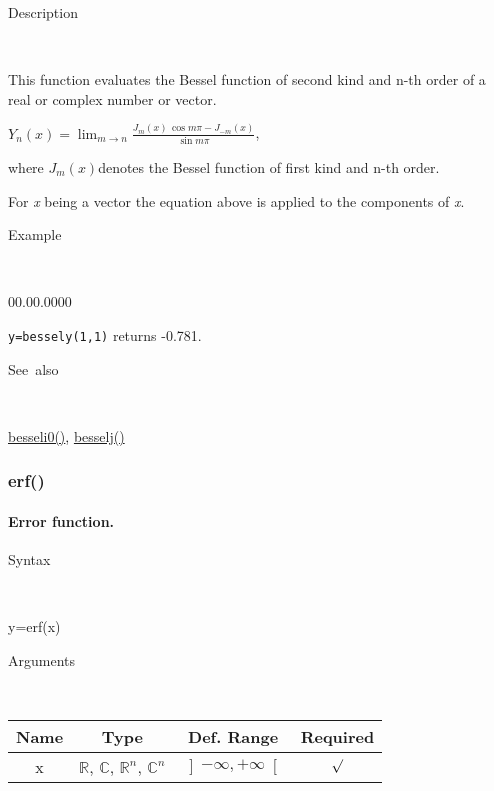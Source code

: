 \begin{description}
\item [Description]~
\end{description}
This function evaluates the Bessel function of second kind and n-th
order of a real or complex number or vector.

\medskip{}
$Y_{n}\left(x\right)={\displaystyle \lim_{m\rightarrow n}\frac{J_{m}\left(x\right)\,\cos m\pi-J_{-m}\left(x\right)}{\sin m\pi}}$,
\medskip{}

where $J_{m}\left(x\right)$denotes the Bessel function of first kind
and n-th order.
\medskip{}

For \textit{x} being a vector the equation above is applied
to the components of \textit{x}.

\begin{description}
\item [Example]~
\end{description}
\begin{lyxlist}{00.00.0000}
\item [\texttt{y=bessely(1,1)}]returns -0.781.
\end{lyxlist}
\begin{description}
\item [See~also]~
\end{description}
\textcolor{blue}{\hyperlink{besseli0}{besseli0()}}\textcolor{black}{,}
\textcolor{blue}{\hyperlink{besselj}{besselj()}}


\newpage
\subsubsection*{\hypertarget{erf}{}{\Large erf()}}


\paragraph{\label{par:Error-function}Error function.}

\begin{description}
\item [Syntax]~
\end{description}
y=erf(x)

\begin{description}
\item [Arguments]~
\end{description}
\begin{tabular}{|c|c|c|c|}
\hline 
Name&
Type&
Def. Range&
Required\tabularnewline
\hline
\hline 
x&
$\mathbb{R}$, $\mathbb{C}$, $\mathbb{R}^{n}$, $\mathbb{C}^{n}$&
$\left]-\infty,+\infty\right[$&
$\surd$\tabularnewline
\hline
\end{tabular}

